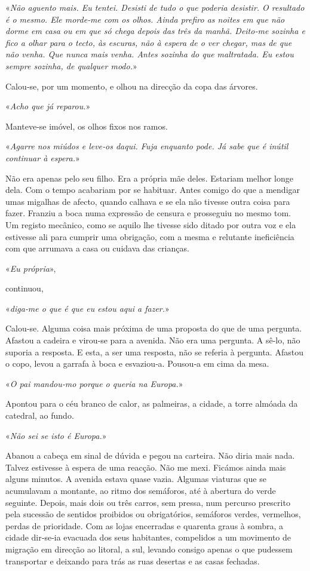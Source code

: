 «\emph{Não aguento mais. Eu tentei. Desisti de tudo o que poderia
desistir. O resultado é o mesmo. Ele morde­‑me com os olhos. Ainda
prefiro as noites em que não dorme em casa ou em que só chega depois das
três da manhã. Deito­‑me sozinha e fico a olhar para o tecto, às
escuras, não à espera de o ver chegar, mas de que não venha. Que nunca
mais venha. Antes sozinha do que maltratada. Eu estou sempre sozinha, de
qualquer modo.}»

Calou­‑se, por um momento, e olhou na direcção da copa das árvores.

«\emph{Acho que já reparou.}»

Manteve­‑se imóvel, os olhos fixos nos ramos.

«\emph{Agarre nos miúdos e leve­‑os daqui. Fuja enquanto pode. Já sabe
que é inútil continuar à espera.}»

Não era apenas pelo seu filho. Era a própria mãe deles. Estariam melhor
longe dela. Com o tempo acabariam por se habituar. Antes comigo do que a
mendigar umas migalhas de afecto, quando calhava e se ela não tivesse
outra coisa para fazer. Franziu a boca numa expressão de censura e
prosseguiu no mesmo tom. Um registo mecânico, como se aquilo lhe tivesse
sido ditado por outra voz e ela estivesse ali para cumprir uma
obrigação, com a mesma e relutante ineficiência com que arrumava a casa
ou cuidava das crianças.

«\emph{Eu própria}»,

continuou,

«\emph{diga­‑me o que é que eu estou aqui a fazer.}»

Calou­‑se. Alguma coisa mais próxima de uma proposta do que de uma
pergunta. Afastou a cadeira e virou­‑se para a avenida. Não era uma
pergunta. A sê­‑lo, não suporia a resposta. E esta, a ser uma resposta,
não se referia à pergunta. Afastou o copo, levou a garrafa à boca e
esvaziou­‑a. Pousou­‑a em cima da mesa.

«\emph{O pai mandou­‑mo porque o queria na Europa.}»

Apontou para o céu branco de calor, as palmeiras, a cidade, a torre
almóada da catedral, ao fundo.

«\emph{Não sei se isto é Europa.}»

Abanou a cabeça em sinal de dúvida e pegou na carteira. Não diria mais
nada. Talvez estivesse à espera de uma reacção. Não me mexi. Ficámos
ainda mais alguns minutos. A avenida estava quase vazia. Algumas
viaturas que se acumulavam a montante, ao ritmo dos semáforos, até à
abertura do verde seguinte. Depois, mais dois ou três carros, sem
pressa, num percurso prescrito pela sucessão de sentidos proibidos ou
obrigatórios, semáforos verdes, vermelhos, perdas de prioridade. Com as
lojas encerradas e quarenta graus à sombra, a cidade dir­‑se­‑ia
evacuada dos seus habitantes, compelidos a um movimento de migração em
direcção ao litoral, a sul, levando consigo apenas o que pudessem
transportar e deixando para trás as ruas desertas e as casas fechadas.

